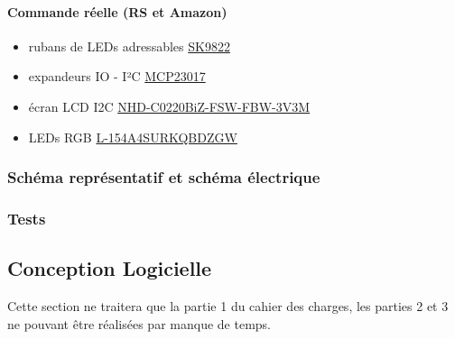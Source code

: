 \documentclass[12pt]{article}
\begin{document}
	\paragraph{Commande réelle (RS et Amazon)}
	\begin{itemize}[label=$-$]
		\item rubans de LEDs adressables \href{https://fr.aliexpress.com/item/1005006918408592.html?spm=a2g0o.productlist.main.19.fbb0788296kxRo&algo_pvid=72d2c9a9-ec47-4e4b-9d14-7e90be35485c&algo_exp_id=72d2c9a9-ec47-4e4b-9d14-7e90be35485c-9&pdp_npi=4%40dis!EUR!18.92!18.92!!!145.68!145.68!%402103888a17169934968957029e0b2f!12000038723750387!sea!FR!0!AB&curPageLogUid=lAauznpLAY1Y&utparam-url=scene%3Asearch%7Cquery_from%3A}{SK9822}\\
		\item expandeurs IO - I²C \href{https://fr.farnell.com/microchip/mcp23017-e-sp/16-bit-expander-i-o-i2c-i-f/dp/1332088}{MCP23017}\\
		\item écran LCD I2C \href{https://fr.rs-online.com/web/p/afficheurs-monochromes-lcd/2644045?searchId=b08a66da-698d-420f-a525-b4944d7ccd96&gb=s}{NHD-C0220BiZ-FSW-FBW-3V3M}\\
		\item LEDs RGB \href{https://fr.rs-online.com/web/p/leds/1651767?gb=s}{L-154A4SURKQBDZGW}\\
	\end{itemize}
	\subsubsection{Schéma représentatif et schéma électrique}
	\subsubsection{Tests}
	\subsection{Conception Logicielle}
	Cette section ne traitera que la partie 1 du cahier des charges, les parties 2 et 3 ne pouvant être réalisées par manque de temps.\\
\end{document}
